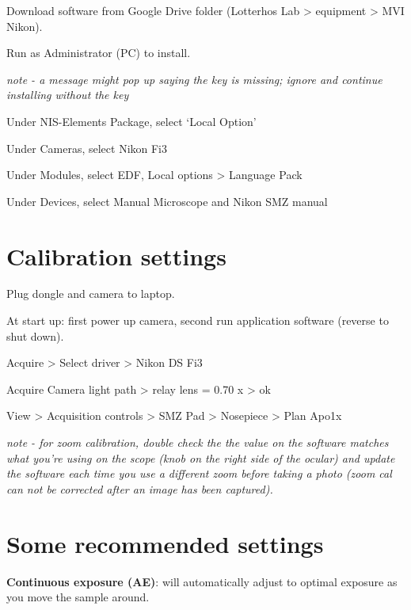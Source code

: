 \documentclass[
  letterpaper,
  DIV=11,
  numbers=noendperiod]{scrreprt}
\begin{document}
Download software from Google Drive folder (Lotterhos Lab \textgreater{}
equipment \textgreater{} MVI Nikon).

Run as Administrator (PC) to install.

\emph{note - a message might pop up saying the key is missing; ignore
and continue installing without the key}

Under NIS-Elements Package, select `Local Option'

Under Cameras, select Nikon Fi3

Under Modules, select EDF, Local options \textgreater{} Language Pack

Under Devices, select Manual Microscope and Nikon SMZ manual

\hypertarget{calibration-settings}{%
\section*{\texorpdfstring{\textbf{Calibration
settings}}{Calibration settings}}\label{calibration-settings}}

Plug dongle and camera to laptop.

At start up: first power up camera, second run application software
(reverse to shut down).

Acquire \textgreater{} Select driver \textgreater{} Nikon DS Fi3

Acquire Camera light path \textgreater{} relay lens = 0.70 x
\textgreater{} ok

View \textgreater{} Acquisition controls \textgreater{} SMZ Pad
\textgreater{} Nosepiece \textgreater{} Plan Apo1x

\emph{note - for zoom calibration, double check the the value on the
software matches what you're using on the scope (knob on the right side
of the ocular) and update the software each time you use a different
zoom before taking a photo (zoom cal can not be corrected after an image
has been captured).}

\hypertarget{some-recommended-settings}{%
\section*{\texorpdfstring{\textbf{Some recommended
settings}}{Some recommended settings}}\label{some-recommended-settings}}

\textbf{Continuous exposure (AE)}: will automatically adjust to optimal
exposure as you move the sample around.
\end{document}
